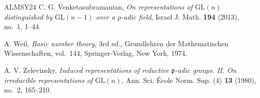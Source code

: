 \documentclass[11pt]{amsart}
\numberwithin{equation}{section}
\theoremstyle{plain}
\theoremstyle{definition}
\theoremstyle{remark}
\begin{document}
\begin{thebibliography}{ALMSY24}
	C. G. Venketasubramanian, \emph{On representations of $\mathrm{GL}(n)$ distinguished by $\mathrm{GL}(n-1)$ over a $p$-adic field}, Israel J. Math. \textbf{194} (2013), no.~1, 1--44.
	
	A. Weil, \emph{Basic number theory}, 3rd ed., Grundlehren der Mathematischen Wissenschaften, vol.~144, Springer-Verlag, New York, 1974.
	
	A. V. Zelevinsky, \emph{Induced representations of reductive $\mathfrak p$-adic groups. II. On irreducible representations of $\mathrm{GL}(n)$}, Ann. Sci. \'Ecole Norm. Sup. (4) \textbf{13} (1980), no.~2, 165--210.

%
%
%
%
%
%
%
%
%

\end{thebibliography}
\end{document}
